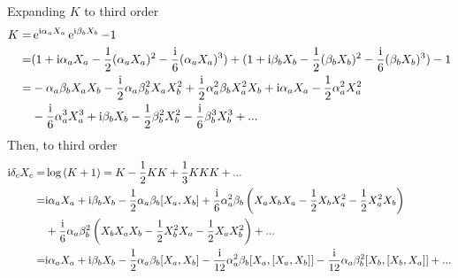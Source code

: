 \documentclass[main.tex]{subfiles}
\begin{document}
Expanding $K$ to third order
\begin{align}
K=&\operatorname{e}^{\mathrm{i}\alpha_aX_a}\operatorname{e}^{\mathrm{i}\beta_bX_b}-1\\
=&(1+\mathrm{i}\alpha_aX_a-\frac{1}{2}(\alpha_aX_a)^2-\frac{\mathrm{i}}{6}(\alpha_aX_a)^3)+(1+\mathrm{i}\beta_bX_b-\frac{1}{2}(\beta_bX_b)^2-\frac{\mathrm{i}}{6}(\beta_bX_b)^3)-1\\
=&-\alpha_a\beta_bX_aX_b-\frac{\mathrm{i}}{2}\alpha_a\beta_b^2X_aX_b^2+\frac{\mathrm{i}}{2}\alpha_a^2\beta_bX_a^2X_b+\mathrm{i}\alpha_aX_a-\frac{1}{2}\alpha_a^2X_a^2\nonumber\\
&-\frac{\mathrm{i}}{6}\alpha_a^3X_a^3+\mathrm{i}\beta_bX_b-\frac{1}{2}\beta_b^2X_b^2-\frac{\mathrm{i}}{6}\beta_b^3X_b^3+...
\end{align}
Then, to third order
\begin{align}
\mathrm{i}\delta_cX_c=&\log{(K+1)}=K-\frac{1}{2}KK+\frac{1}{3}KKK+...\\
=&\mathrm{i}\alpha_aX_a+\mathrm{i}\beta_bX_b-\frac{1}{2}\alpha_a\beta_b[X_a,X_b]+\frac{\mathrm{i}}{6}\alpha_a^2\beta_b\left(X_aX_bX_a-\frac{1}{2}X_bX_a^2-\frac{1}{2}X_a^2X_b\right)\nonumber\\
&+\frac{\mathrm{i}}{6}\alpha_a\beta_b^2\left(X_bX_aX_b-\frac{1}{2}X_b^2X_a-\frac{1}{2}X_aX_b^2\right)+...\\
=&\mathrm{i}\alpha_aX_a+\mathrm{i}\beta_bX_b-\frac{1}{2}\alpha_a\beta_b[X_a,X_b]-\frac{\mathrm{i}}{12}\alpha_a^2\beta_b[X_a,[X_a,X_b]]-\frac{\mathrm{i}}{12}\alpha_a\beta_b^2[X_b,[X_b,X_a]]+...
\end{align}
\end{document}
